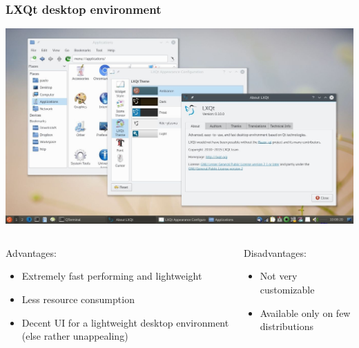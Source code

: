 \begin{frame}
	\frametitle{LXQt desktop environment}
	
	\begin{center}
		\includegraphics[width=.7\linewidth]{../graphics/desktop_examples/lxqt.jpg}
	\end{center}%
	
	\vspace{-\baselineskip}
	
	\begin{columns}
		\begin{column}[t]{.7\linewidth}
			\begin{exampleblock}{Advantages:}
				\begin{itemize}
					\item Extremely fast performing and lightweight
					\item Less resource consumption
					\item Decent UI for a lightweight desktop environment (else rather unappealing)
				\end{itemize}
			\end{exampleblock}
		\end{column}
		\hfill
		\begin{column}[t]{.28\linewidth}
			\begin{alertblock}{Disadvantages:}
				\begin{itemize}
					\item Not very customizable
					\item Available only on few distributions
				\end{itemize}
			\end{alertblock}
		\end{column}
	\end{columns}
	\hfill
\end{frame}
